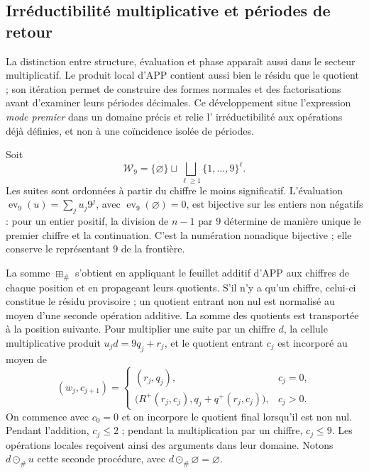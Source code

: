 \subsection{Irréductibilité multiplicative et périodes de retour}
\label{primos-retornos}

La distinction entre structure, évaluation et phase apparaît aussi dans le
secteur multiplicatif. Le produit local d'APP contient aussi bien le résidu
que le quotient ; son itération permet de construire des formes normales et des
factorisations avant d'examiner leurs périodes décimales. Ce développement
situe l'expression \emph{mode premier} dans un domaine précis et relie l'
irréductibilité aux opérations déjà définies, et non à une coïncidence
isolée de périodes.

Soit
\[
 \mathcal W_9=\{\varnothing\}\sqcup
 \bigsqcup_{\ell\geq1}\{1,\ldots,9\}^{\ell}.
\]
Les suites sont ordonnées à partir du chiffre le moins significatif. L'évaluation
\(\operatorname{ev}_9(u)=\sum_j u_j9^j\), avec
\(\operatorname{ev}_9(\varnothing)=0\), est bijective sur les entiers non
négatifs : pour un entier positif, la division de \(n-1\) par \(9\)
détermine de manière unique le premier chiffre et la continuation. C'est la
numération nonadique bijective ; elle conserve le représentant \(9\) de la
frontière.

La somme \(\boxplus_\#\) s'obtient en appliquant le feuillet additif d'APP aux chiffres de chaque position et en propageant leurs quotients. S'il n'y a qu'un chiffre, celui-ci constitue le résidu provisoire ; un quotient entrant non nul est normalisé au moyen d'une seconde opération additive. La somme des quotients est transportée à la position suivante. Pour multiplier une suite par un chiffre \(d\), la cellule multiplicative produit \(u_jd=9q_j+r_j\), et le quotient entrant \(c_j\) est incorporé au moyen de
\[
 (w_j,c_{j+1})=
 \begin{cases}
 (r_j,q_j),&c_j=0,\\
 \bigl(R^+(r_j,c_j),q_j+q^+(r_j,c_j)\bigr),&c_j>0.
 \end{cases}
\]
On commence avec \(c_0=0\) et on incorpore le quotient final lorsqu'il est non
nul. Pendant l'addition, \(c_j\leq2\) ; pendant la multiplication par un chiffre,
\(c_j\leq9\). Les opérations locales reçoivent ainsi des arguments dans
leur domaine. Notons \(d\odot_\#u\) cette seconde procédure,
avec \(d\odot_\#\varnothing=\varnothing\).

